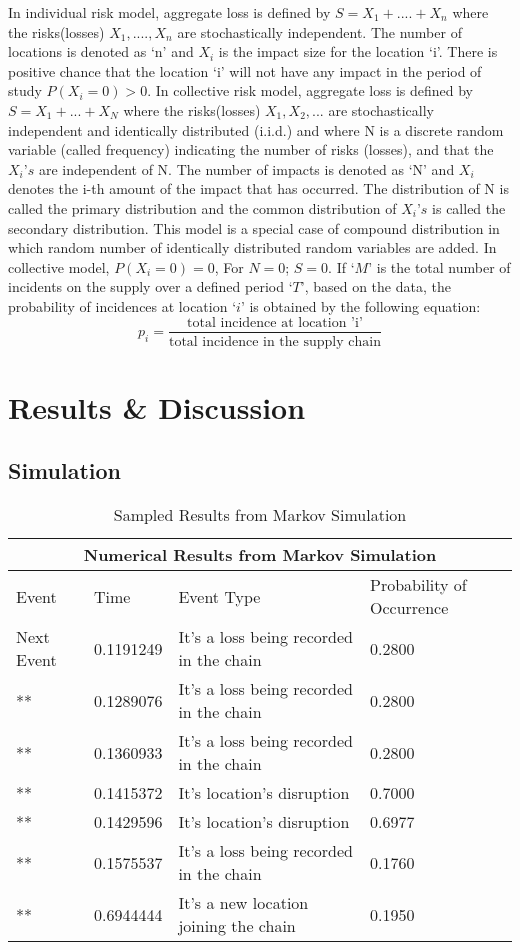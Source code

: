\documentclass[conference]{IEEEtran}
\begin{document}
In individual risk model, aggregate loss is defined by $S = X_1+....+X_n$ where the risks(losses) ${X_1,....,X_n}$ are stochastically independent. The number of locations is denoted as ‘n’ and $X_{i}$ is the impact size for the location ‘i’. There is positive chance that the location ‘i’ will not have any impact in the period of study $P(X_i=0)>0$.\newline 
In collective risk model, aggregate loss is defined by $S=X_1+...+X_N$ where the risks(losses) ${X_1,X_2,...}$ are stochastically independent and identically distributed (i.i.d.) and where N is a discrete random variable (called frequency) indicating the number of risks (losses), and that the $X_i’s$ are independent of N. The number of impacts is denoted as ‘N’ and $X_i$ denotes the i-th amount of the impact that has occurred. The distribution of N is called the primary distribution and the common distribution of $X_i’s$ is called the secondary distribution. This model is a special case of compound distribution in which random number of identically distributed random variables are added. In collective model, $P(X_i=0)=0$, For $N = 0$; $S = 0$.\newline
If $‘M’$ is the total number of incidents on the supply over a defined period $‘T’$, based on the data, the probability of incidences at location $‘i’$ is obtained by the following equation:\newline
\[ p_i
= \frac{\text{total incidence at location 'i'}}{\text{total incidence in the supply chain}}
\]

\section{Results \& Discussion}
\subsection{Simulation}

\begin{table}[h!]
\centering
\caption{Sampled Results from Markov Simulation}
\label{NumericalResult_Markov}
\begin{tabular}{|p{1.5cm}||p{1.5cm}|p{1.5cm}||p{1.5cm}|}
\hline
\multicolumn{4}{|c|}{Numerical Results from Markov Simulation} \\
\hline
Event & Time & Event Type & Probability of Occurrence \\
\hline
Next Event & 0.1191249  & It's a loss being recorded in the chain &  0.2800 \\
** & 0.1289076 & It's a loss being recorded in the chain & 0.2800 \\
** & 0.1360933 & It's a loss being recorded in the chain &  0.2800 \\
** & 0.1415372 & It's location's disruption & 0.7000 \\
** & 0.1429596 & It's location's disruption & 0.6977 \\
** & 0.1575537 & It's a loss being recorded in the chain & 0.1760 \\
** & 0.6944444 & It's a new location joining the chain & 0.1950 \\
\hline
\end{tabular}
\end{table}
\end{document}

